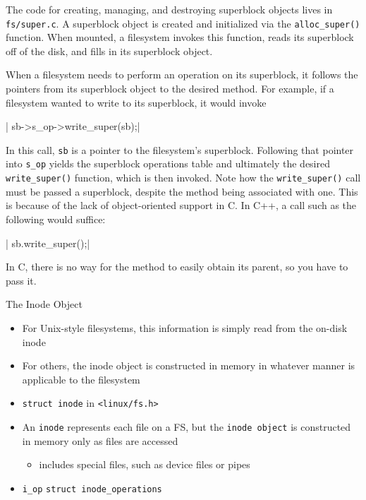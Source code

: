 The code for creating, managing, and destroying superblock objects lives in
\texttt{fs/super.c}. A superblock object is created and initialized via the
\verb|alloc_super()| function. When mounted, a filesystem invokes this function, reads its
superblock off of the disk, and fills in its superblock object.

When a filesystem needs to perform an operation on its superblock, it follows the pointers
from its superblock object to the desired method. For example, if a filesystem wanted to
write to its superblock, it would invoke

\begin{center}
  | sb->s_op->write_super(sb);|
\end{center}

In this call, \texttt{sb} is a pointer to the filesystem's superblock. Following that
pointer into \verb|s_op| yields the superblock operations table and ultimately the desired
\verb|write_super()| function, which is then invoked. Note how the \verb|write_super()|
call must be passed a superblock, despite the method being associated with one. This is
because of the lack of object-oriented support in C. In C++, a call such as the following
would suffice:

\begin{center}
  | sb.write_super();|
\end{center}

In C, there is no way for the method to easily obtain its parent, so you have to pass
it.

\begin{frame}
  \begin{block}{The Inode Object}
    \begin{itemize}
    \item For Unix-style filesystems, this information is simply read from the on-disk
      inode
    \item For others, the inode object is constructed in memory in whatever manner is
      applicable to the filesystem
    \item \texttt{struct inode} in \texttt{<linux/fs.h>}
    \item An \texttt{inode} represents each file on a FS, but the \texttt{inode object} is
      constructed in memory only as files are accessed
      \begin{itemize}
      \item includes special files, such as device files or pipes
      \end{itemize}
    \item \texttt{i\_op} {\pright} \texttt{struct inode\_operations}
    \end{itemize}
  \end{block}  
\end{frame}

